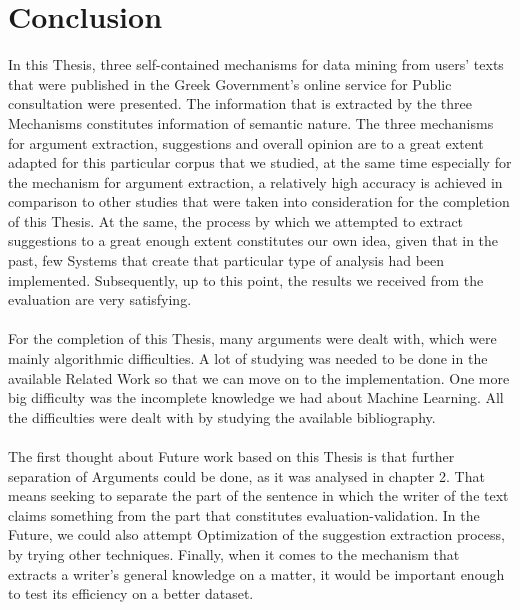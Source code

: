 \chapter{Conclusion}
In this Thesis, three self-contained mechanisms for data mining from users' texts that were published in the Greek Government's online service for Public consultation were presented. The information that is extracted by the three Mechanisms constitutes information of semantic nature. The three mechanisms for argument extraction, suggestions and overall opinion are to a great extent adapted for this particular corpus that we studied, at the same time especially for the mechanism for argument extraction, a relatively high accuracy is achieved in comparison to other studies that were taken into consideration for the completion of this Thesis. At the same, the process by which we attempted to extract suggestions to a great enough extent constitutes our own idea, given that in the past, few Systems that create that particular type of analysis had been implemented. Subsequently, up to this point, the results we received from the evaluation are very satisfying.\\
\\
For the completion of this Thesis, many arguments were dealt with, which were mainly algorithmic difficulties. A lot of studying was needed to be done in the available Related Work so that we can move on to the implementation. One more big difficulty was the incomplete knowledge we had about Machine Learning. All the difficulties were dealt with by studying the available bibliography.\\
\\
The first thought about Future work based on this Thesis is that further separation of Arguments could be done, as it was analysed in chapter 2. That means seeking to separate the part of the sentence in which the writer of the text claims something from the part that constitutes evaluation-validation. In the Future, we could also attempt Optimization of the suggestion extraction process, by trying other techniques. Finally, when it comes to the mechanism that extracts a writer's general knowledge on a matter, it would be important enough to test its efficiency on a better dataset.